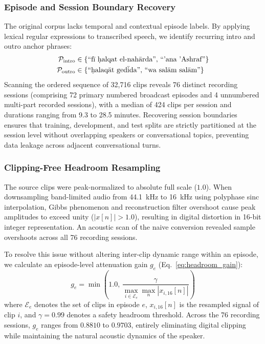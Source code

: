 \documentclass[journal]{IEEEtran}
\begin{document}
\subsubsection{Episode and Session Boundary Recovery}
The original corpus lacks temporal and contextual episode labels. By applying lexical regular expressions to transcribed speech, we identify recurring intro and outro anchor phrases:
\begin{align}
\mathcal{P}_{\text{intro}} &\in \{\text{``f\={\i} \d{h}alqat el-nah\=arda''},\, \text{``'ana 'Ashraf''}\} \\
\mathcal{P}_{\text{outro}} &\in \{\text{``\d{h}alaq\=at ged\=ida''},\, \text{``wa sal\=am sal\=am''}\}
\end{align}
Scanning the ordered sequence of 32,716 clips reveals 76 distinct recording sessions (comprising 72 primary numbered broadcast episodes and 4 unnumbered multi-part recorded sessions), with a median of 424 clips per session and durations ranging from 9.3 to 28.5 minutes. Recovering session boundaries ensures that training, development, and test splits are strictly partitioned at the session level without overlapping speakers or conversational topics, preventing data leakage across adjacent conversational turns.

\subsubsection{Clipping-Free Headroom Resampling}
The source clips were peak-normalized to absolute full scale ($1.0$). When downsampling band-limited audio from 44.1~kHz to 16~kHz using polyphase sinc interpolation, Gibbs phenomenon and reconstruction filter overshoot cause peak amplitudes to exceed unity ($|x[n]| > 1.0$), resulting in digital distortion in 16-bit integer representation. An acoustic scan of the naive conversion revealed sample overshoots across all 76 recording sessions.

To resolve this issue without altering inter-clip dynamic range within an episode, we calculate an episode-level attenuation gain $g_e$ (Eq.~\ref{eq:headroom_gain}):
\begin{equation}
g_e = \min\left(1.0,\, \frac{\gamma}{\max_{i \in \mathcal{E}_e} \max_n |x_{i,16}[n]|}\right)
\label{eq:headroom_gain}
\end{equation}
where $\mathcal{E}_e$ denotes the set of clips in episode $e$, $x_{i,16}[n]$ is the resampled signal of clip $i$, and $\gamma = 0.99$ denotes a safety headroom threshold. Across the 76 recording sessions, $g_e$ ranges from $0.8810$ to $0.9703$, entirely eliminating digital clipping while maintaining the natural acoustic dynamics of the speaker.
\end{document}
